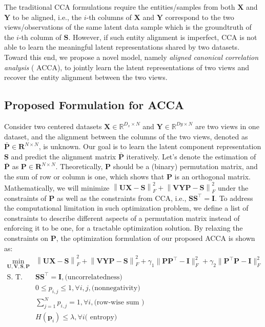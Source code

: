 
The traditional CCA formulations require the entities/samples from both $\mathbf{X}$ and $\mathbf{Y}$ to be aligned, i.e., the $i$-th columns of  $\mathbf{X}$ and $\mathbf{Y}$ correspond to the two views/observations of the same latent data sample which is the groundtruth of the $i$-th
column of $\mathbf{S}$. However, if such entity alignment is imperfect, CCA is not able to learn the meaningful latent representations shared by two datasets. Toward this end, we propose a novel model, namely \emph{aligned canonical correlation analysis} (
ACCA), to jointly learn the latent representations of two views and recover the entity alignment between the two views.

\subsection{Proposed Formulation for ACCA}
Consider two centered datasets $\mathbf{X}\in \mathbb{R}^{D_x \times N}$ and $\mathbf{Y}\in \mathbb{R}^{Dy \times N}$ are two views in one dataset, and the alignment between the columns of the two views, denoted as $\bar{\mathbf{P}}\in\mathbf{R}^{N\times N}$, is unknown. Our goal is to learn the latent component representation $\mathbf{S}$ and predict the alignment matrix $\bar{\mathbf{P}}$ iteratively. Let's denote the estimation of $\bar{\mathbf{P}}$ as ${\mathbf{P}}\in\mathbf{R}^{N\times N}$. Theoretically, $\mathbf{P}$ should be a (binary) permutation matrix, and the sum of row or column is one, which shows that $\mathbf{P}$ is an orthogonal matrix. Mathematically, we will minimize $\left \|\mathbf{U}{\mathbf{X}} -\mathbf{S}\right\|_F^2 + \left\|\mathbf{V}{\mathbf{Y}}\mathbf{P} -\mathbf{S}\right\|_F^2$ under the constraints of $\mathbf{P}$ as well as the constraints from CCA, i.e., $\mathbf{SS}^\top =\mathbf{I}$. To address the computational limitation in such optimization problem, we define a list of constraints to describe different aspects of a permutation matrix instead of enforcing it to be one, for a tractable optimization solution. By relaxing the constraints on $\mathbf{P}$, the optimization formulation of our proposed ACCA is shown as:
\begin{align}
	\min_{\mathbf{U},\mathbf{V}, \mathbf{S},\mathbf{P}}   & \left \|\mathbf{U}{\mathbf{X}} -\mathbf{S}\right\|_F^2 + \left\|\mathbf{V}{\mathbf{Y}}\mathbf{P} -\mathbf{S}\right\|_F^2+\gamma_1\|\mathbf{P}\mathbf{P}^\top -\mathbf{I}\|_F^2+\gamma_2\|\mathbf{P}^\top\mathbf{P} -\mathbf{I}\|_F^2\label{eq:acca_loss}\\
  \text {S. T. } \quad&\mathbf{SS}^\top =\mathbf{I}, \text{(uncorrelatedness)}\\ 
 &0\le p_{i,j}\le 1, \forall i, j, \text{(nonnegativity)}\label{eq:con1}\\
 &\sum_{j=1}^N p_{i,j}=1, \forall i, \text{(row-wise sum )}\label{eq:con2}\\
 &H(\mathbf{p}_i)\le \lambda, \forall i \text{( entropy)}\label{eq:acca}
	\end{align}
